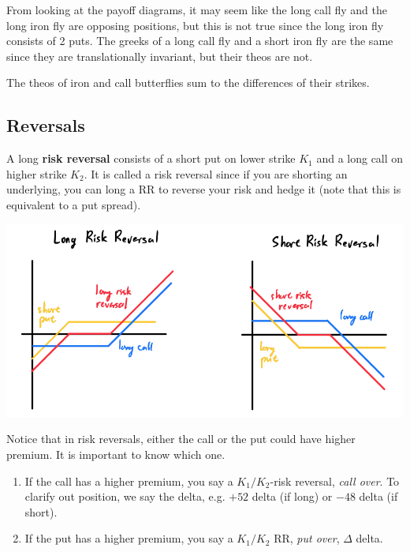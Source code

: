 \documentclass{article}
\begin{document}
    From looking at the payoff diagrams, it may seem like the long call fly and the long iron fly are opposing positions, but this is not true since the long iron fly consists of 2 puts. The greeks of a long call fly and a short iron fly are the same since they are translationally invariant, but their theos are not. 

    \begin{theorem}
      The theos of iron and call butterflies sum to the differences of their strikes. 
    \end{theorem}

  \subsection{Reversals}

    \begin{definition}
      A long \textbf{risk reversal} consists of a short put on lower strike $K_1$ and a long call on higher strike $K_2$. It is called a risk reversal since if you are shorting an underlying, you can long a RR to reverse your risk and hedge it (note that this is equivalent to a put spread). 
      \begin{center}
        \includegraphics[scale=0.3]{img/risk_reversal.png}
      \end{center}
      Notice that in risk reversals, either the call or the put could have higher premium. It is important to know which one. 
      \begin{enumerate}
        \item If the call has a higher premium, you say a $K_1/K_2$-risk reversal, \textit{call over}. To clarify out position, we say the delta, e.g. $+52$ delta (if long) or $-48$ delta (if short).  
        \item If the put has a higher premium, you say a $K_1/K_2$ RR, \textit{put over}, $\Delta$ delta. 
      \end{enumerate}
    \end{definition}
\end{document}
